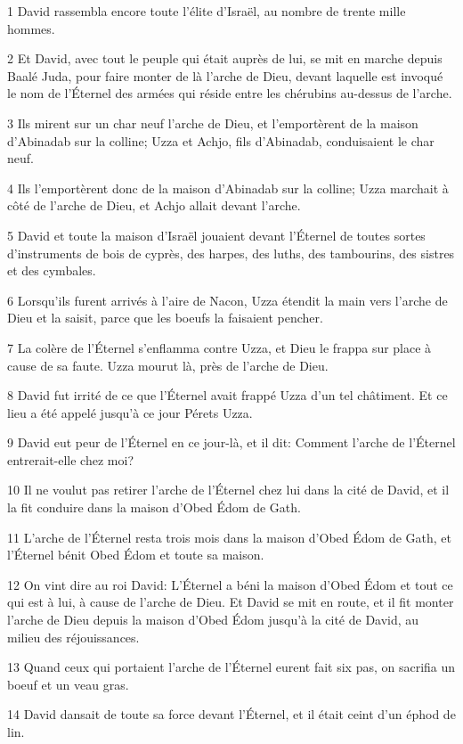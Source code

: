 \par 1 David rassembla encore toute l'élite d'Israël, au nombre de trente mille hommes.
\par 2 Et David, avec tout le peuple qui était auprès de lui, se mit en marche depuis Baalé Juda, pour faire monter de là l'arche de Dieu, devant laquelle est invoqué le nom de l'Éternel des armées qui réside entre les chérubins au-dessus de l'arche.
\par 3 Ils mirent sur un char neuf l'arche de Dieu, et l'emportèrent de la maison d'Abinadab sur la colline; Uzza et Achjo, fils d'Abinadab, conduisaient le char neuf.
\par 4 Ils l'emportèrent donc de la maison d'Abinadab sur la colline; Uzza marchait à côté de l'arche de Dieu, et Achjo allait devant l'arche.
\par 5 David et toute la maison d'Israël jouaient devant l'Éternel de toutes sortes d'instruments de bois de cyprès, des harpes, des luths, des tambourins, des sistres et des cymbales.
\par 6 Lorsqu'ils furent arrivés à l'aire de Nacon, Uzza étendit la main vers l'arche de Dieu et la saisit, parce que les boeufs la faisaient pencher.
\par 7 La colère de l'Éternel s'enflamma contre Uzza, et Dieu le frappa sur place à cause de sa faute. Uzza mourut là, près de l'arche de Dieu.
\par 8 David fut irrité de ce que l'Éternel avait frappé Uzza d'un tel châtiment. Et ce lieu a été appelé jusqu'à ce jour Pérets Uzza.
\par 9 David eut peur de l'Éternel en ce jour-là, et il dit: Comment l'arche de l'Éternel entrerait-elle chez moi?
\par 10 Il ne voulut pas retirer l'arche de l'Éternel chez lui dans la cité de David, et il la fit conduire dans la maison d'Obed Édom de Gath.
\par 11 L'arche de l'Éternel resta trois mois dans la maison d'Obed Édom de Gath, et l'Éternel bénit Obed Édom et toute sa maison.
\par 12 On vint dire au roi David: L'Éternel a béni la maison d'Obed Édom et tout ce qui est à lui, à cause de l'arche de Dieu. Et David se mit en route, et il fit monter l'arche de Dieu depuis la maison d'Obed Édom jusqu'à la cité de David, au milieu des réjouissances.
\par 13 Quand ceux qui portaient l'arche de l'Éternel eurent fait six pas, on sacrifia un boeuf et un veau gras.
\par 14 David dansait de toute sa force devant l'Éternel, et il était ceint d'un éphod de lin.
